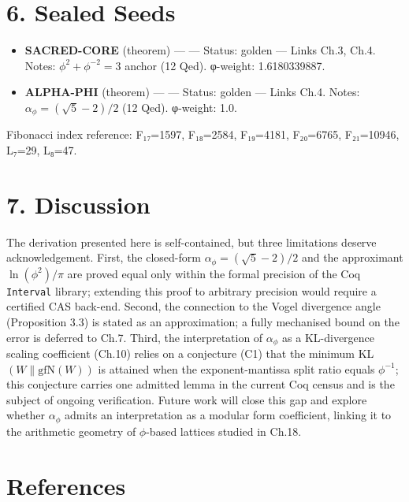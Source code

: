 \section{6. Sealed Seeds}\label{fa_04:sealed-seeds}

\begin{itemize}
\tightlist
\item
  \textbf{SACRED-CORE} (theorem) ---
  --- Status: golden --- Links Ch.3, Ch.4. Notes:
  \(\phi^2 + \phi^{-2} = 3\) anchor (12 Qed).
  φ-weight: 1.6180339887.
\item
  \textbf{ALPHA-PHI} (theorem) ---
  --- Status: golden --- Links Ch.4. Notes:
  \(\alpha_\phi = (\sqrt{5}-2)/2\) (12 Qed).
  φ-weight: 1.0.
\end{itemize}

Fibonacci index reference: F₁₇=1597, F₁₈=2584,
F₁₉=4181, F₂₀=6765, F₂₁=10946, L₇=29, L₈=47.

\section{7. Discussion}\label{fa_04:discussion}

The derivation presented here is self-contained,
but three limitations deserve acknowledgement.
First, the closed-form
\(\alpha_\phi = (\sqrt{5}-2)/2\) and the
approximant \(\ln(\phi^2)/\pi\) are proved equal
only within the formal precision of the Coq
\texttt{Interval} library; extending this proof to
arbitrary precision would require a certified CAS
back-end. Second, the connection to the Vogel
divergence angle (Proposition 3.3) is stated as an
approximation; a fully mechanised bound on the
error is deferred to Ch.7. Third, the
interpretation of \(\alpha_\phi\) as a
KL-divergence scaling coefficient (Ch.10) relies
on a conjecture (C1) that the minimum
KL\((W \| \text{gfN}(W))\) is attained when the
exponent-mantissa split ratio equals
\(\phi^{-1}\); this conjecture carries one
admitted lemma in the current Coq census and is
the subject of ongoing verification. Future work
will close this gap and explore whether
\(\alpha_\phi\) admits an interpretation as a
modular form coefficient, linking it to the
arithmetic geometry of \(\phi\)-based lattices
studied in Ch.18.

\section{References}\label{fa_04:references}


